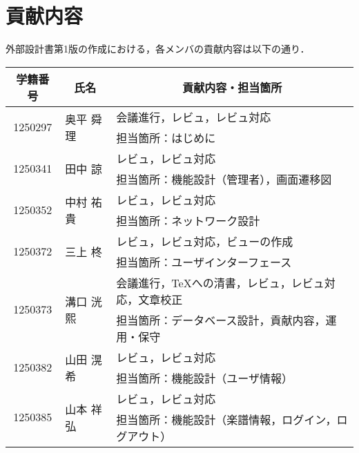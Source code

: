 \chapter{貢献内容}
外部設計書第1版の作成における，各メンバの貢献内容は以下の通り．
\begin{table}[h]
    \centering
    \begin{tabularx}{\textwidth}{cll}
        \multicolumn{1}{c}{学籍番号} & \multicolumn{1}{c}{氏名} & \multicolumn{1}{c}{貢献内容・担当箇所} \\
        \hline
        \multirow{2}{*}{1250297} & \multirow{2}{*}{奥平 舜理} & 会議進行，レビュ，レビュ対応                     \\
                                 &                        & 担当箇所：はじめに                         \\
        \hline
        \multirow{2}{*}{1250341} & \multirow{2}{*}{田中 諒}  & レビュ，レビュ対応                     \\
                                 &                        & 担当箇所：機能設計（管理者），画面遷移図                         \\
        \hline
        \multirow{2}{*}{1250352} & \multirow{2}{*}{中村 祐貴} & レビュ，レビュ対応                     \\
                                 &                        & 担当箇所：ネットワーク設計                         \\
        \hline
        \multirow{2}{*}{1250372} & \multirow{2}{*}{三上 柊}  & レビュ，レビュ対応，ビューの作成                     \\
                                 &                        & 担当箇所：ユーザインターフェース                         \\
        \hline
        \multirow{2}{*}{1250373} & \multirow{2}{*}{溝口 洸熙} & 会議進行，\TeX への清書，レビュ，レビュ対応，文章校正           \\
                                 &                        & 担当箇所：データベース設計，貢献内容，運用・保守                         \\
        \hline
        \multirow{2}{*}{1250382} & \multirow{2}{*}{山田 滉希} & レビュ，レビュ対応                     \\
                                 &                        & 担当箇所：機能設計（ユーザ情報）                         \\
        \hline
        \multirow{2}{*}{1250385} & \multirow{2}{*}{山本 祥弘} & レビュ，レビュ対応                     \\
                                 &                        & 担当箇所：機能設計（楽譜情報，ログイン，ログアウト）                         \\
        \hline
    \end{tabularx}
\end{table}